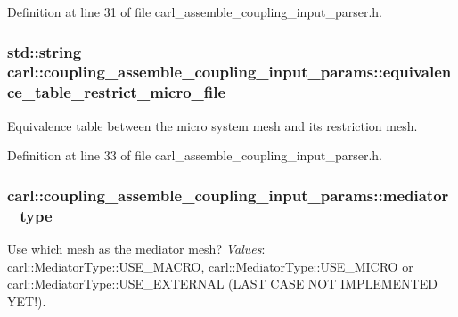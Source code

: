 Definition at line 31 of file carl\+\_\+assemble\+\_\+coupling\+\_\+input\+\_\+parser.\+h.

\hypertarget{structcarl_1_1coupling__assemble__coupling__input__params_a07948e27f6a1a82cffbd1780f28350c7}{}
\subsubsection[{equivalence\+\_\+table\+\_\+restrict\+\_\+micro\+\_\+file}]{\setlength{\rightskip}{0pt plus 5cm}std\+::string carl\+::coupling\+\_\+assemble\+\_\+coupling\+\_\+input\+\_\+params\+::equivalence\+\_\+table\+\_\+restrict\+\_\+micro\+\_\+file}\label{structcarl_1_1coupling__assemble__coupling__input__params_a07948e27f6a1a82cffbd1780f28350c7}


Equivalence table between the micro system mesh and its restriction mesh. 



Definition at line 33 of file carl\+\_\+assemble\+\_\+coupling\+\_\+input\+\_\+parser.\+h.

\hypertarget{structcarl_1_1coupling__assemble__coupling__input__params_aa520455b2876272ffc924f060f2a332a}{}
\subsubsection[{mediator\+\_\+type}]{ carl\+::coupling\+\_\+assemble\+\_\+coupling\+\_\+input\+\_\+params\+::mediator\+\_\+type}\label{structcarl_1_1coupling__assemble__coupling__input__params_aa520455b2876272ffc924f060f2a332a}


Use which mesh as the mediator mesh? {\itshape Values}\+: carl\+::\+Mediator\+Type\+::\+U\+S\+E\+\_\+\+M\+A\+C\+R\+O, carl\+::\+Mediator\+Type\+::\+U\+S\+E\+\_\+\+M\+I\+C\+R\+O or carl\+::\+Mediator\+Type\+::\+U\+S\+E\+\_\+\+E\+X\+T\+E\+R\+N\+A\+L (L\+A\+S\+T C\+A\+S\+E N\+O\+T I\+M\+P\+L\+E\+M\+E\+N\+T\+E\+D Y\+E\+T!). 



